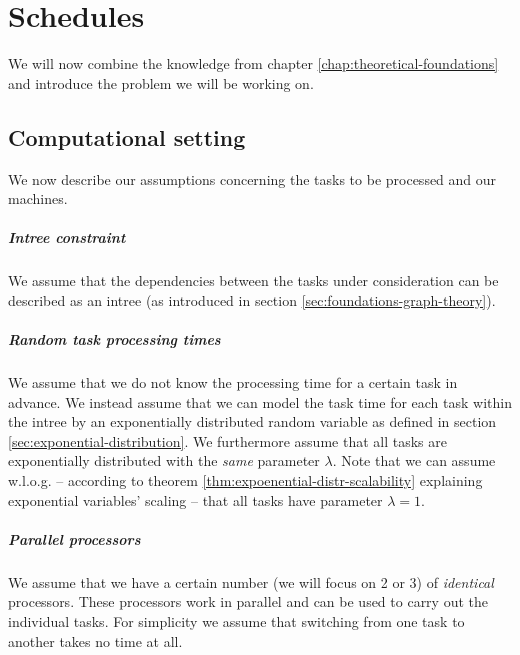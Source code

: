 \chapter{Schedules}
\label{chap:introduction-schedules}

We will now combine the knowledge from chapter \ref{chap:theoretical-foundations} and introduce the problem we will be working on. 

\section{Computational setting }
\label{sec:schedules-problem-setting}

We now describe our assumptions concerning the tasks to be processed and our machines.

\paragraph{Intree constraint}

We assume that the dependencies between the tasks under consideration can be described as an intree (as introduced in  section \ref{sec:foundations-graph-theory}).

\paragraph{Random task processing times}

We assume that we do not know the processing time for a certain task in advance. We instead assume that we can model the task time for each task within the intree by an exponentially distributed random variable as defined in section \ref{sec:exponential-distribution}. We furthermore assume that all tasks are exponentially distributed with the \emph{same} parameter $\lambda$. Note that we can assume w.l.o.g. --  according to theorem \ref{thm:expoenential-distr-scalability} explaining exponential variables' scaling -- that all tasks have parameter $\lambda=1$.

\paragraph{Parallel processors}

We assume that we have a certain number (we will focus on 2 or 3) of \emph{identical} processors. These processors work in parallel and can be used to carry out the individual tasks. For simplicity we assume that switching from one task to another takes no time at all.

